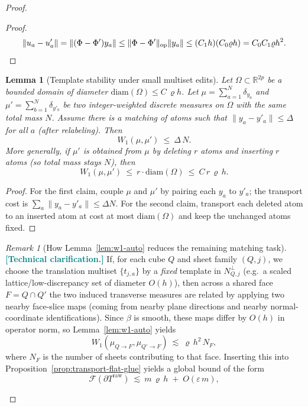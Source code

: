 \documentclass[11pt]{article}
\newcommand{\REVMZ}[1]{\textcolor{teal}{#1}}  %
\numberwithin{equation}{section}  %
\theoremstyle{plain}
\newtheorem{lemma}[theorem]{Lemma}
\theoremstyle{definition}
\theoremstyle{remark}
\newtheorem{remark}[theorem]{Remark}
\newcommand{\R}{\mathbb{R}}
\begin{document}
\begin{proof}
\begin{proof}
\[
\|u_a-u'_a\|
=\|(\Phi-\Phi')y_a\|
\le \|\Phi-\Phi'\|_{\mathrm{op}}\|y_a\|
\le (C_1h)(C_0\varrho h)=C_0C_1\varrho h^2.
\qedhere
\]
\end{proof}


\begin{lemma}[Template stability under small multiset edits]\label{lem:w1-template-edit}
Let $\Omega\subset\R^{2p}$ be a bounded domain of diameter $\mathrm{diam}(\Omega)\le C\,\varrho h$.
Let $\mu=\sum_{a=1}^{N}\delta_{y_a}$ and $\mu'=\sum_{b=1}^{N}\delta_{y'_b}$ be two integer-weighted discrete measures on $\Omega$
with the \emph{same total mass} $N$.
Assume there is a matching of atoms such that $\|y_a-y'_a\|\le \Delta$ for all $a$ (after relabeling).
Then
\[
W_1(\mu,\mu')\ \le\ \Delta\,N.
\]
More generally, if $\mu'$ is obtained from $\mu$ by deleting $r$ atoms and inserting $r$ atoms (so total mass stays $N$), then
\[
W_1(\mu,\mu')\ \le\ r\cdot \mathrm{diam}(\Omega)\ \le\ C\,r\,\varrho\,h.
\]
\end{lemma}

\begin{proof}
For the first claim, couple $\mu$ and $\mu'$ by pairing each $y_a$ to $y'_a$; the transport cost is $\sum_a\|y_a-y'_a\|\le \Delta N$.
For the second claim, transport each deleted atom to an inserted atom at cost at most $\mathrm{diam}(\Omega)$ and keep the unchanged atoms fixed.
\end{proof}

\begin{remark}[How Lemma~\ref{lem:w1-auto} reduces the remaining matching task]\label{rem:w1-auto}
\REVMZ{\textbf{[Technical clarification.]}}
If, for each cube $Q$ and sheet family $(Q,j)$, we choose the translation multiset $\{t_{j,a}\}$ by a \emph{fixed} template in
$N_{Q,j}^\perp$ (e.g.\ a scaled lattice/low-discrepancy set of diameter $O(h)$), then across a shared face $F=Q\cap Q'$ the two
induced transverse measures are related by applying two nearby face-slice maps (coming from nearby plane directions and nearby normal-coordinate identifications).
Since $\beta$ is smooth, these maps differ by $O(h)$ in operator norm, so Lemma~\ref{lem:w1-auto} yields
\[
W_1(\mu_{Q\to F},\mu_{Q'\to F})\ \lesssim\ \varrho\,h^2\,N_F,
\]
where $N_F$ is the number of sheets contributing to that face.
Inserting this into Proposition~\ref{prop:transport-flat-glue} yields a global bound of the form
\[
\mathcal F(\partial T^{\mathrm{raw}})\ \lesssim\ m\,\varrho\,h \;+\; O(\varepsilon\,m),
\]


\end{remark}
\end{proof}
\end{document}
